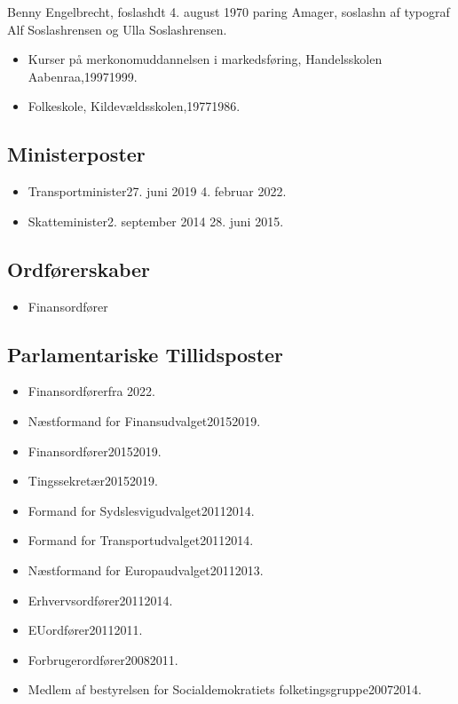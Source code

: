 \documentclass[11pt, a4paper]{awesome-cv}
\begin{document}
\makecvheader[R]
\makelettertitle
\begin{cvletter}
Benny Engelbrecht, foslashdt 4. august 1970 paring Amager, soslashn af typograf Alf Soslashrensen og Ulla Soslashrensen.

\begin{itemize}
\item Kurser på merkonomuddannelsen i markedsføring, Handelsskolen Aabenraa,19971999.
\item Folkeskole, Kildevældsskolen,19771986.
\end{itemize}
\subsection*{Ministerposter}
\begin{itemize}
\item Transportminister27. juni 2019  4. februar 2022.
\item Skatteminister2. september 2014  28. juni 2015.
\end{itemize}
\subsection*{Ordførerskaber}
\begin{itemize}
\item Finansordfører
\end{itemize}
\subsection*{Parlamentariske Tillidsposter}
\begin{itemize}
\item Finansordførerfra 2022.
\item Næstformand for Finansudvalget20152019.
\item Finansordfører20152019.
\item Tingssekretær20152019.
\item Formand for Sydslesvigudvalget20112014.
\item Formand for Transportudvalget20112014.
\item Næstformand for Europaudvalget20112013.
\item Erhvervsordfører20112014.
\item EUordfører20112011.
\item Forbrugerordfører20082011.
\item Medlem af bestyrelsen for Socialdemokratiets folketingsgruppe20072014.
\end{itemize}

\end{cvletter}
\end{document}
